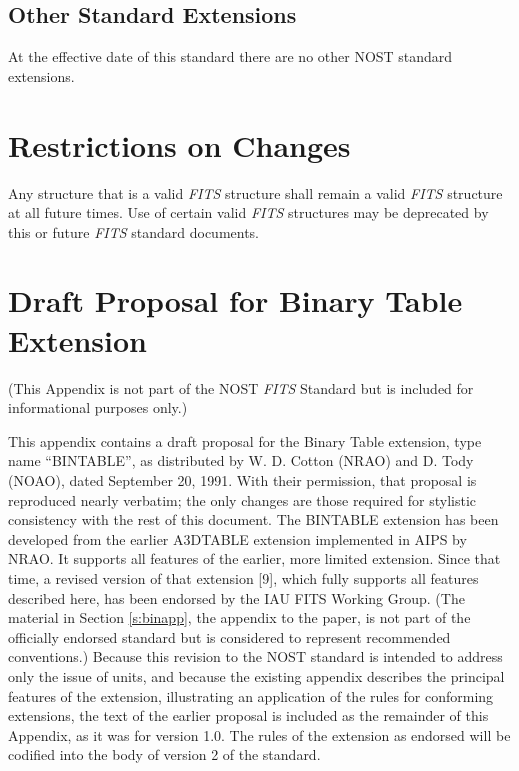 \section{Other Standard Extensions}
   At the effective date of this standard there are no 
   other NOST standard 
   extensions.


\chapter{Restrictions on Changes}
  \label{s:Restrict}
   Any structure that is a valid {\em FITS\/} 
   structure shall remain 
   a valid {\em FITS\/} structure at all future times. Use of certain 
   valid {\em FITS\/} structures may be 
   deprecated by this or 
   future {\em FITS\/} standard documents.
  
  
\appendix  
  
  
\chapter{Draft Proposal for Binary Table Extension}
    \label{s:Bintbl}
   (This Appendix is not part of the NOST {\em FITS\/} Standard but 
   is included for informational purposes only.)         
  
This appendix contains a draft proposal for the 
Binary Table extension, type name ``BINTABLE'', 
as distributed
by W. D. Cotton (NRAO) and D. Tody (NOAO), 
dated September 20, 1991.  
With their permission, that proposal is reproduced
nearly verbatim; the only changes are those required for 
stylistic consistency with the rest of this document.
The BINTABLE extension has been developed from the earlier
A3DTABLE extension
implemented in AIPS by NRAO.
It supports all features of the earlier, more limited extension.  
Since that time, a revised version of 
that extension [9], which fully supports all features described 
here, has been endorsed by the IAU
FITS Working Group.  (The material in 
Section \ref{s:binapp}, the appendix to the paper, is not 
part of the officially endorsed standard but is considered to 
represent recommended conventions.)
Because this revision to the NOST standard is intended to address only
the issue of units, and because the existing appendix describes the
principal features of the extension, illustrating an application of
the rules for conforming
extensions, the text of the earlier
proposal is included as the remainder of this Appendix, as it was for
version 1.0.  The rules of the extension as endorsed will be codified
into the body of version 2 of the standard. 

